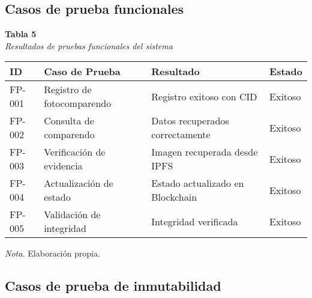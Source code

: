 
\subsection{Casos de prueba funcionales}

\begin{table}[htbp]
    \begin{flushleft}
        \textbf{Tabla 5}\\[2em]
        \textit{Resultados de pruebas funcionales del sistema}
    \end{flushleft}
    \vspace{1em}
    \centering
    \begin{tabular}{p{2cm} p{4cm} p{3cm} p{3cm}}
        \toprule
        \textbf{ID} & \textbf{Caso de Prueba} & \textbf{Resultado} & \textbf{Estado} \\
        \midrule
        FP-001 & Registro de fotocomparendo & Registro exitoso con CID & Exitoso \\
        FP-002 & Consulta de comparendo & Datos recuperados correctamente & Exitoso \\
        FP-003 & Verificación de evidencia & Imagen recuperada desde IPFS & Exitoso \\
        FP-004 & Actualización de estado & Estado actualizado en Blockchain & Exitoso \\
        FP-005 & Validación de integridad & Integridad verificada & Exitoso \\
        \bottomrule
    \end{tabular}
    \vspace{2em}
    \begin{flushleft}
        \textit{Nota.} Elaboración propia.
    \end{flushleft}
    \label{tab:resultados_funcionales}
\end{table}

\subsection{Casos de prueba de inmutabilidad}

